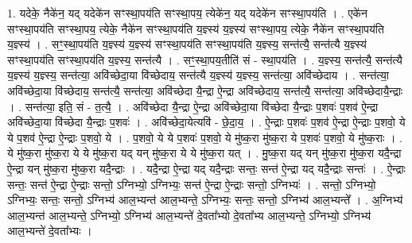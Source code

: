 \documentclass[17pt]{extarticle}
\begin{document}
1. यदेके॒ नैके॑न॒ यद् यदेके॑न सꣳस्था॒पय॑ति सꣳस्था॒पय॒ त्येके॑न॒ यद् यदेके॑न सꣳस्था॒पय॑ति । . एके॑न सꣳस्था॒पय॑ति सꣳस्था॒पय॒ त्येके॒ नैके॑न सꣳस्था॒पय॑ति य॒ज्ञ्स्य॑ य॒ज्ञ्स्य॑ सꣳस्था॒पय॒ त्येके॒ नैके॑न सꣳस्था॒पय॑ति य॒ज्ञ्स्य॑ । . सꣳ॒॒स्था॒पय॑ति य॒ज्ञ्स्य॑ य॒ज्ञ्स्य॑ सꣳस्था॒पय॑ति सꣳस्था॒पय॑ति य॒ज्ञ्स्य॒ सन्त॑त्यै॒ सन्त॑त्यै य॒ज्ञ्स्य॑ सꣳस्था॒पय॑ति सꣳस्था॒पय॑ति य॒ज्ञ्स्य॒ सन्त॑त्यै । . सꣳ॒॒स्था॒पय॒तीति॑ सं - स्था॒पय॑ति । . य॒ज्ञ्स्य॒ सन्त॑त्यै॒ सन्त॑त्यै य॒ज्ञ्स्य॑ य॒ज्ञ्स्य॒ सन्त॑त्या॒ अवि॑च्छेदा॒या वि॑च्छेदाय॒ सन्त॑त्यै य॒ज्ञ्स्य॑ य॒ज्ञ्स्य॒ सन्त॑त्या॒ अवि॑च्छेदाय । . सन्त॑त्या॒ अवि॑च्छेदा॒या वि॑च्छेदाय॒ सन्त॑त्यै॒ सन्त॑त्या॒ अवि॑च्छेदा यै॒न्द्रा ऐ॒न्द्रा अवि॑च्छेदाय॒ सन्त॑त्यै॒ सन्त॑त्या॒ अवि॑च्छेदायै॒न्द्राः । . सन्त॑त्या॒ इति॒ सं - त॒त्यै॒ । . अवि॑च्छेदा यै॒न्द्रा ऐ॒न्द्रा अवि॑च्छेदा॒या वि॑च्छेदा यै॒न्द्राः प॒शवः॑ प॒शव॑ ऐ॒न्द्रा अवि॑च्छेदा॒या वि॑च्छेदा यै॒न्द्राः प॒शवः॑ । . अवि॑च्छेदा॒येत्यवि॑ - छे॒दा॒य॒ । . ऐ॒न्द्राः प॒शवः॑ प॒शव॑ ऐ॒न्द्रा ऐ॒न्द्राः प॒शवो॒ ये ये प॒शव॑ ऐ॒न्द्रा ऐ॒न्द्राः प॒शवो॒ ये । . प॒शवो॒ ये ये प॒शवः॑ प॒शवो॒ ये मु॑ष्क॒रा मु॑ष्क॒रा ये प॒शवः॑ प॒शवो॒ ये मु॑ष्क॒राः । . ये मु॑ष्क॒रा मु॑ष्क॒रा ये ये मु॑ष्क॒रा यद् यन् मु॑ष्क॒रा ये ये मु॑ष्क॒रा यत् । . मु॒ष्क॒रा यद् यन् मु॑ष्क॒रा मु॑ष्क॒रा यदै॒न्द्रा ऐ॒न्द्रा यन् मु॑ष्क॒रा मु॑ष्क॒रा यदै॒न्द्राः । . यदै॒न्द्रा ऐ॒न्द्रा यद् यदै॒न्द्राः सन्तः॒ सन्त॑ ऐ॒न्द्रा यद् यदै॒न्द्राः सन्तः॑ । . ऐ॒न्द्राः सन्तः॒ सन्त॑ ऐ॒न्द्रा ऐ॒न्द्राः सन्तो॒ ऽग्निभ्यो॒ ऽग्निभ्यः॒ सन्त॑ ऐ॒न्द्रा ऐ॒न्द्राः सन्तो॒ ऽग्निभ्यः॑ । . सन्तो॒ ऽग्निभ्यो॒ ऽग्निभ्यः॒ सन्तः॒ सन्तो॒ ऽग्निभ्य॑ आल॒भ्यन्त॑ आल॒भ्यन्ते॒ ऽग्निभ्यः॒ सन्तः॒ सन्तो॒ ऽग्निभ्य॑ आल॒भ्यन्ते᳚ । . अ॒ग्निभ्य॑ आल॒भ्यन्त॑ आल॒भ्यन्ते॒ ऽग्निभ्यो॒ ऽग्निभ्य॑ आल॒भ्यन्ते॑ दे॒वता᳚भ्यो दे॒वता᳚भ्य आल॒भ्यन्ते॒ ऽग्निभ्यो॒ ऽग्निभ्य॑ आल॒भ्यन्ते॑ दे॒वता᳚भ्यः । \newline
\end{document}
